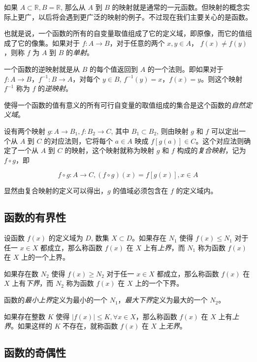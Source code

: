 \documentclass[lang=cn,10pt]{elegantbook}
\begin{document}
如果 $A \subset \mathbb R, B = \mathbb R$, 那么从 $A$ 到 $B$ 的映射就是通常的一元函数。但映射的概念实际上更广，以后将会遇到更广泛的映射的例子。不过现在我们主要关心的是函数。

也就是说，一个函数的所有的自变量取值组成了它的定义域，即原像，而它的值组成了它的像集。如果对于 $f: A \rightarrow B$，对于任意的两个 $x, y \in A$， $f(x) \neq f(y)$，则称 $f$ 为 $A$ 到 $B$ 的\emph{单射}。

一个函数的逆映射就是从 $B$ 的每个值返回到 $A$ 的一个法则。即如果对于 $f: A \rightarrow B$，$f^{-1}: B \rightarrow A$，对每个 $y \in B$, $f^{-1}(y) = x$，$f(x) = y$。则这个映射 $f^{-1}$ 称为 $f$ 的\emph{逆映射}。

使得一个函数的值有意义的所有可行自变量的取值组成的集合是这个函数的\emph{自然定义域}。

设有两个映射 $g: A \rightarrow B_1, f: B_2 \rightarrow C$, 其中 $B_1 \subset B_2$, 则由映射 $g$ 和 $f$ 可以定出一个从 $A$ 到 $C$ 的对应法则，它将每个 $a \in A$ 映成 $f[g(a)] \in C$。这个对应法则确定了一个从 $A$ 到 $C$ 的映射，这个映射就称为映射 $g$ 和 $f$ 构成的\emph{复合映射}，记为 $f\circ g$，即

\begin{equation*}
  f \circ g: A \rightarrow C, (f \circ g)(x) = f[g(x)], x \in A
\end{equation*}

显然由复合映射的定义可以得出，$g$ 的值域必须包含在 $f$ 的定义域内。

\subsection{函数的有界性}

设函数 $f(x)$ 的定义域为 $D$, 数集 $X \subset D$。如果存在 $N_1$ 使得 $f(x) \leq N_1$ 对于任一 $x \in X$ 都成立，那么称函数 $f(x)$ 在 $X$ 上有\emph{上界}，而 $N_1$ 称为函数 $f(x)$ 在 $X$ 上的一个上界。

如果存在数 $N_2$ 使得 $f(x) \geq N_2$ 对于任一 $x \in X$ 都成立，那么称函数 $f(x)$ 在 $X$ 上有\emph{下界}，而 $N_2$ 称为函数 $f(x)$ 在 $X$ 上的一个下界。

函数的\emph{最小上界}定义为最小的一个 $N_1$，\emph{最大下界}定义为最大的一个 $N_2$。

如果存在整数 $K$ 使得 $|f(x)| \leq K, \forall x \in X$，那么称函数 $f(x)$ 在 $X$ 上有\emph{上界}。如果这样的 $K$ 不存在，就称函数 $f(x)$ 在 $X$ 上\emph{无界}。

\subsection{函数的奇偶性}
\end{document}
